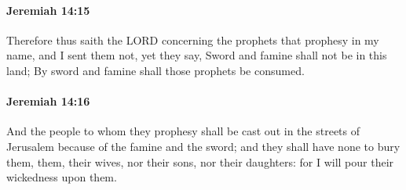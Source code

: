 		\paragraph{Jeremiah 14:15} %
			\label{JEREMIAH-14-15}

			Therefore thus saith the LORD concerning the prophets that prophesy in my name, and I sent them not, yet they say, Sword and famine shall not be in this land; By sword and famine shall those prophets be consumed.


		\paragraph{Jeremiah 14:16} %
			\label{JEREMIAH-14-16}

			And the people to whom they prophesy shall be cast out in the streets of Jerusalem because of the famine and the sword; and they shall have none to bury them, them, their wives, nor their sons, nor their daughters: for I will pour their wickedness upon them.

